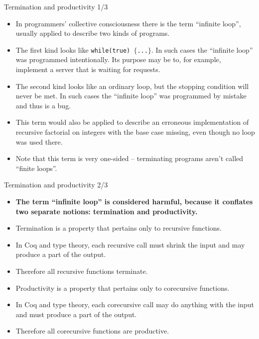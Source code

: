 \documentclass{beamer}
\begin{document}
\begin{frame}{Termination and productivity 1/3}
\begin{itemize}
	\item In programmers' collective consciousness there is the term ``infinite loop'', usually applied to describe two kinds of programs.
	\item The first kind looks like \texttt{while(true) $\lbrace$...$\rbrace$}. In such cases the ``infinite loop'' was programmed intentionally. Its purpose may be to, for example, implement a server that is waiting for requests.
	\item The second kind looks like an ordinary loop, but the stopping condition will never be met. In such cases the ``infinite loop'' was programmed by mistake and thus is a bug.
	\item This term would also be applied to describe an erroneous implementation of recursive factorial on integers with the base case missing, even though no loop was used there.
	\item Note that this term is very one-sided -- terminating programs aren't called ``finite loops''.
\end{itemize}
\end{frame}

\begin{frame}{Termination and productivity 2/3}
\begin{itemize}
	\item \textbf{The term ``infinite loop'' is considered harmful, because it conflates two separate notions: termination and productivity.}
	\item Termination is a property that pertains only to recursive functions.
	\item In Coq and type theory, each recursive call must shrink the input and may produce a part of the output.
	\item Therefore all recursive functions terminate.
	\item Productivity is a property that pertains only to corecursive functions.
	\item In Coq and type theory, each corecursive call may do anything with the input and must produce a part of the output.
	\item Therefore all corecursive functions are productive.
\end{itemize}
\end{frame}
\end{document}
